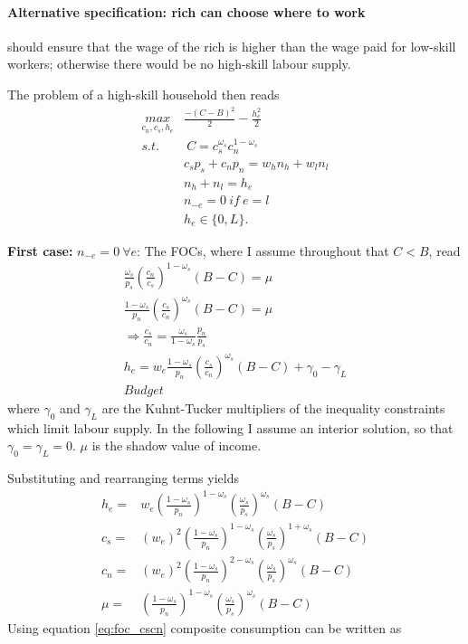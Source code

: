 \paragraph{Alternative specification: rich can choose where to work } \ar should ensure that the wage of the rich is higher than the wage paid for low-skill workers; otherwise there would be no high-skill labour supply.

The problem of a high-skill household then reads
\begin{align*}
\underset{c_n, c_s, h_e}{max}& \frac{-(C-B)^2}{2}- \frac{h_e^2}{2}\\
s.t.& \ C= c_s^{\omega_s} c_n^{1-\omega_s}\\
& c_sp_s+c_np_n=w_h n_h+w_l n_l\\
& n_h+n_l=h_e\\
& n_{-e}=0 \ if\ e=l\\
& h_e\in\{0,L\}.
\end{align*}

\textbf{First case:} $n_{-e}=0 \ \forall e$: The FOCs, where I  assume throughout that $C<B$, read
\begin{align}
\frac{\omega_s}{p_s}\left(\frac{c_n}{c_s}\right)^{1-\omega_s}\left(B-C\right)=\mu\\
\frac{1-\omega_s}{p_n}\left(\frac{c_s}{c_n}\right)^{\omega_s}\left(B-C\right)=\mu\\
\Rightarrow \frac{c_s}{c_n}=\frac{\omega_s}{1-\omega_s}\frac{p_n}{p_s}\label{eq:foc_cscn}\\
h_e=w_e\frac{1-\omega_s}{p_n}\left(\frac{c_s}{c_n}\right)^{\omega_s}\left(B-C\right) +\gamma_0 -\gamma_L\\
Budget
\end{align} 
where $\gamma_0$ and $\gamma_L$ are the Kuhnt-Tucker multipliers of the inequality constraints which limit labour supply. In the following I assume an interior solution, so that $\gamma_0=\gamma_L=0$. 
$\mu$ is the shadow value of income. 

Substituting and rearranging terms yields
\begin{align*}
h_e=& w_e\left(\frac{1-\omega_s}{p_n}\right)^{1-\omega_s}\left(\frac{\omega_s}{p_s}\right)^{\omega_s}(B-C)\\
c_s=&  (w_e)^2\left(\frac{1-\omega_s}{p_n}\right)^{1-\omega_s}\left(\frac{\omega_s}{p_s}\right)^{1+\omega_s}(B-C)\\
c_n=& (w_e)^2\left(\frac{1-\omega_s}{p_n}\right)^{2-\omega_s}\left(\frac{\omega_s}{p_s}\right)^{\omega_s}(B-C)\\
\mu=& \left(\frac{1-\omega_s}{p_n}\right)^{1-\omega_s}\left(\frac{\omega_s}{p_s}\right)^{\omega_s}(B-C)
\end{align*}
Using equation \ref{eq:foc_cscn} composite consumption can be written as 

